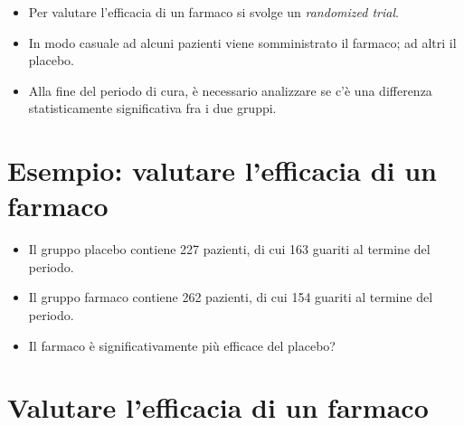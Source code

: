\documentclass[
]{article}
\providecommand{\tightlist}{%
  \setlength{\itemsep}{0pt}\setlength{\parskip}{0pt}}
\begin{document}
\begin{itemize}
\tightlist
\item
  Per valutare l'efficacia di un farmaco si svolge un \emph{randomized
  trial}.
\end{itemize}

\bigskip

\begin{itemize}
\tightlist
\item
  In modo casuale ad alcuni pazienti viene somministrato il farmaco; ad
  altri il placebo.
\end{itemize}

\bigskip

\begin{itemize}
\tightlist
\item
  Alla fine del periodo di cura, è necessario analizzare se c'è una
  differenza statisticamente significativa fra i due gruppi.
\end{itemize}

\hypertarget{esempio-valutare-lefficacia-di-un-farmaco-1}{%
\section{Esempio: valutare l'efficacia di un
farmaco}\label{esempio-valutare-lefficacia-di-un-farmaco-1}}

\begin{itemize}
\tightlist
\item
  Il gruppo placebo contiene 227 pazienti, di cui 163 guariti al termine
  del periodo.
\end{itemize}

\bigskip

\begin{itemize}
\tightlist
\item
  Il gruppo farmaco contiene 262 pazienti, di cui 154 guariti al termine
  del periodo.
\end{itemize}

\bigskip

\begin{itemize}
\tightlist
\item
  Il farmaco è significativamente più efficace del placebo?
\end{itemize}

\hypertarget{valutare-lefficacia-di-un-farmaco}{%
\section{Valutare l'efficacia di un
farmaco}\label{valutare-lefficacia-di-un-farmaco}}
\end{document}
